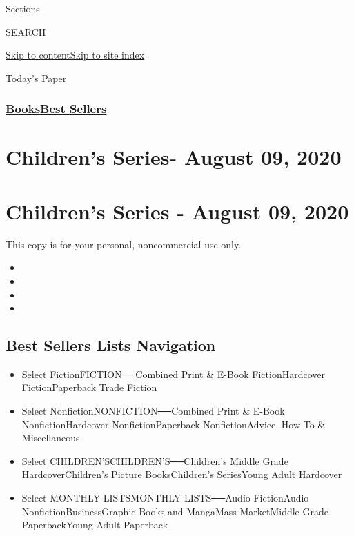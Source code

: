 Sections

SEARCH

\protect\hyperlink{site-content}{Skip to
content}\protect\hyperlink{site-index}{Skip to site index}

\href{https://myaccount.nytimes3xbfgragh.onion/auth/login?response_type=cookie\&client_id=vi}{}

\href{https://www.nytimes3xbfgragh.onion/section/todayspaper}{Today's
Paper}

\hypertarget{booksbest-sellers}{%
\subsubsection{\texorpdfstring{\href{/section/books/}{Books}\textbar{}\href{/books/best-sellers/}{Best
Sellers}}{Books\textbar{}Best Sellers}}\label{booksbest-sellers}}

\hypertarget{childrens-series--august-09-2020}{%
\section{Children's Series- August 09,
2020}\label{childrens-series--august-09-2020}}

\hypertarget{childrens-series---august-09-2020}{%
\section{Children's Series - August 09,
2020}\label{childrens-series---august-09-2020}}

This copy is for your personal, noncommercial use only.

\begin{itemize}
\item
\item
\item
\item
\end{itemize}

\hypertarget{best-sellers-lists-navigation}{%
\subsection{Best Sellers Lists
Navigation}\label{best-sellers-lists-navigation}}

\begin{itemize}
\tightlist
\item
  Select FictionFICTION──Combined Print \& E-Book FictionHardcover
  FictionPaperback Trade Fiction
\item
  Select NonfictionNONFICTION──Combined Print \& E-Book
  NonfictionHardcover NonfictionPaperback NonfictionAdvice, How-To \&
  Miscellaneous
\item
  Select CHILDREN'SCHILDREN'S──Children's Middle Grade
  HardcoverChildren's Picture BooksChildren's SeriesYoung Adult
  Hardcover
\item
  Select MONTHLY LISTSMONTHLY LISTS──Audio FictionAudio
  NonfictionBusinessGraphic Books and MangaMass MarketMiddle Grade
  PaperbackYoung Adult Paperback
\end{itemize}

